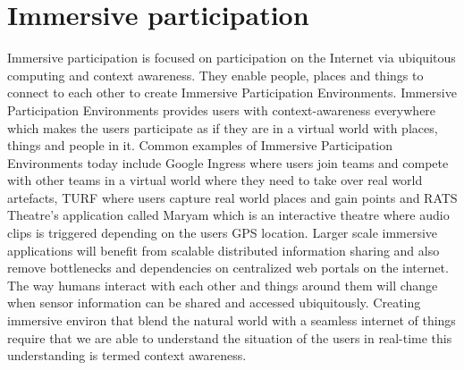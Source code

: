 \section{Immersive participation}
Immersive participation is focused on participation on the Internet via ubiquitous computing and context awareness. They enable people, places and things to connect to each other to create Immersive Participation Environments. Immersive Participation Environments provides users with context-awareness everywhere which makes the users participate as if they are in a virtual world with places, things and people in it. Common examples of Immersive Participation Environments today include Google Ingress \cite{ingress} where users join teams and compete with other teams in a virtual world where they need to take over real world artefacts, TURF \cite{turf} where users capture real world places and gain points and RATS Theatre's \cite{rats} application called Maryam \cite{maryam} which is an interactive theatre where audio clips is triggered depending on the users GPS location.
Larger scale immersive applications will benefit from scalable distributed information sharing and also remove bottlenecks and dependencies on centralized web portals on the internet.
The way humans interact with each other and things around them will change when sensor information can be shared and accessed ubiquitously. 
Creating immersive environ that blend the natural world with a seamless internet of things require that we are able to understand the situation of the users in real-time this understanding is termed context awareness.